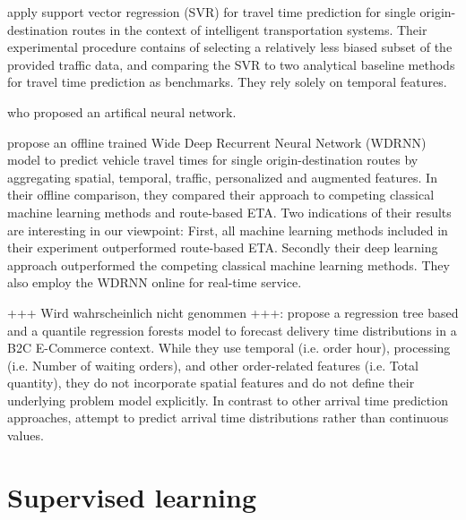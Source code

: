 \cite{Wu2004_SVR} apply support vector regression (SVR) for travel time prediction for single origin-destination routes in the context of intelligent transportation systems. Their experimental procedure contains of selecting a relatively less biased subset of the provided traffic data, and comparing the SVR to two analytical baseline methods for travel time prediction as benchmarks. They rely solely on temporal features.

\cite{Chen2004_ANNKalman} who proposed an artifical neural network.

\cite{Wang2018_WDR} propose an offline trained Wide Deep Recurrent Neural Network (WDRNN) model to predict vehicle travel times for single origin-destination routes by aggregating spatial, temporal, traffic, personalized and augmented features. In their offline comparison, they compared their approach to competing classical machine learning methods and route-based ETA. Two indications of their results are interesting in our viewpoint: First, all machine learning methods included in their experiment outperformed route-based ETA. Secondly their deep learning approach outperformed the competing classical machine learning methods. They also employ the WDRNN online for real-time service.

+++ Wird wahrscheinlich nicht genommen +++:
\cite{Salari2020} propose a regression tree based and a  quantile regression forests model to forecast delivery time distributions in a B2C E-Commerce context. While they use temporal (i.e. \glqq order hour\grqq), processing (i.e. \glqq Number of waiting orders\grqq), and other order-related features (i.e. \glqq Total quantity\grqq), they do not incorporate spatial features and do not define their underlying problem model explicitly. In contrast to other arrival time prediction approaches, \cite{Salari2020} attempt to predict arrival time distributions rather than continuous values.  

\section{Supervised learning}




